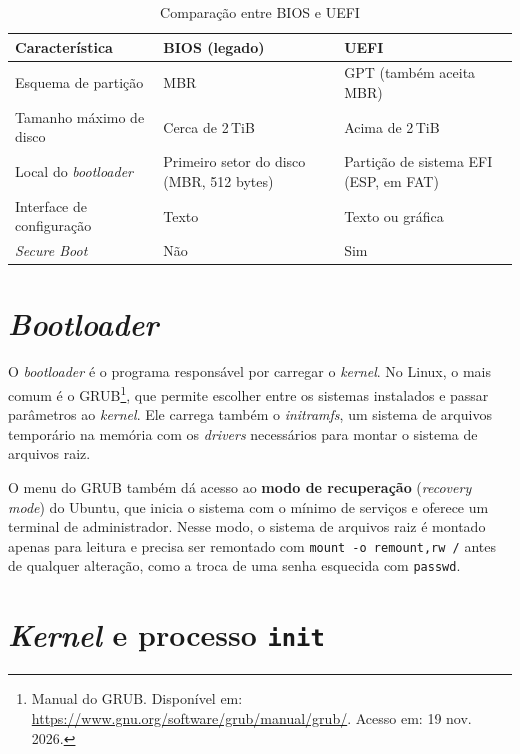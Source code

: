 \begin{table}[H]
    \centering
    \caption{Comparação entre BIOS e UEFI}
    \label{tab:bios-uefi}
    \begin{tabularx}{\linewidth}{lXX}
        \toprule
        \textbf{Característica} & \textbf{BIOS (legado)} & \textbf{UEFI} \\
        \midrule
        Esquema de partição & MBR & GPT (também aceita MBR) \\
        Tamanho máximo de disco & Cerca de 2\,TiB & Acima de 2\,TiB \\
        Local do \textit{bootloader} & Primeiro setor do disco (MBR, 512 bytes) & Partição de sistema EFI (ESP, em FAT) \\
        Interface de configuração & Texto & Texto ou gráfica \\
        \textit{Secure Boot} & Não & Sim \\
        \bottomrule
    \end{tabularx}
\end{table}

\section{\textit{Bootloader}}\label{sec:bootloader}

O \textit{bootloader} é o programa responsável por carregar o \textit{kernel}. No Linux, o mais
comum é o GRUB\footnote{Manual do GRUB. Disponível em:
\url{https://www.gnu.org/software/grub/manual/grub/}. Acesso em: 19 nov. 2026.}, que permite
escolher entre os sistemas instalados e passar parâmetros ao \textit{kernel}. Ele carrega também
o \textit{initramfs}, um sistema de arquivos temporário na memória com os \textit{drivers}
necessários para montar o sistema de arquivos raiz.

O menu do GRUB também dá acesso ao \textbf{modo de recuperação} (\textit{recovery mode}) do
Ubuntu, que inicia o sistema com o mínimo de serviços e oferece um terminal de administrador.
Nesse modo, o sistema de arquivos raiz é montado apenas para leitura e precisa ser remontado
com \texttt{mount -o remount,rw /} antes de qualquer alteração, como a troca de uma senha
esquecida com \texttt{passwd}.

\section{\textit{Kernel} e processo \texttt{init}}\label{sec:init}

